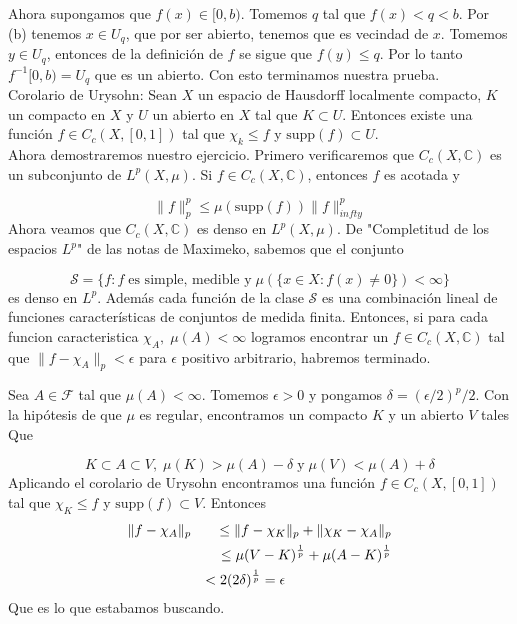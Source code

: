 \documentclass[12pt]{article}
\begin{document}
    Ahora supongamos que $f(x)\in [0,b)$. Tomemos $q$ tal que $f(x) < q < b$. Por (b)
    tenemos $x\in U_q$, que por ser abierto, tenemos que es vecindad de $x$. Tomemos 
    $y\in U_q$, entonces de la definici\'on de $f$ se sigue que $f(y) \leq q$. Por lo 
    tanto $f^{-1}[0,b) = U_q$ que es un abierto. Con esto terminamos nuestra prueba.
    \\

    Corolario de Urysohn: Sean $X$ un espacio de Hausdorff localmente compacto, $K$ un 
    compacto en $X$ y $U$ un abierto en $X$ tal que $K\subset U$. Entonces existe una 
    funci\'on $f\in C_c(X,[0,1])$ tal que $\chi_k \leq f$ y $\mathrm{supp} (f)\subset U$.
    \\

    Ahora demostraremos nuestro ejercicio. Primero verificaremos que $C_c(X,\mathbb{C})$ 
    es un subconjunto de $L^p(X,\mu)$. Si $f\in C_c(X,\mathbb{C})$, entonces $f$ es acotada
    y 

    \[\|f\|_p^p \leq \mu(\mathrm{supp}(f))\|f\|_{infty}^p\]
    Ahora veamos que $C_c(X,\mathbb{C})$ es denso en $L^p(X,\mu)$. De "Completitud de los espacios $L^p$"
    de las notas de Maximeko, sabemos que el conjunto 

    \[\mathcal{S} = \{f : f\;\text{es simple, medible y}\; \mu(\{x\in X : f(x)\neq 0\}) < \infty\}\]
    es denso en $L^p$. Adem\'as cada funci\'on de la clase $\mathcal{S}$ es una combinaci\'on
    lineal de funciones caracter\'isticas de conjuntos de medida finita. Entonces, si 
    para cada funcion caracteristica $\chi_A,\; \mu(A) < \infty$ logramos encontrar un $f\in C_c(X,\mathbb{C})$
    tal que $\|f-\chi_A\|_p < \epsilon$ para $\epsilon$ positivo arbitrario, habremos 
    terminado.

    Sea $A\in \mathcal{F}$ tal que $\mu(A) < \infty$. Tomemos $\epsilon > 0$ y pongamos 
    $\delta = (\epsilon/2)^p/2$. Con la hip\'otesis de que $\mu$ es regular, encontramos 
    un compacto $K$ y un abierto $V$ tales Que

    \[K\subset A \subset V,\; \mu(K) > \mu(A)-\delta\; \text{y}\; \mu(V) < \mu(A)+\delta\]
    Aplicando el corolario de Urysohn encontramos una funci\'on $f\in C_c(X,[0,1])$ tal que 
    $\chi_K \leq f$ y $\mathrm{supp}(f) \subset V$. Entonces
    \begin{equation*}
        \begin{aligned}
            &\|f-\chi_A\|_p & \leq \|f-\chi_K\|_p+\|\chi_K-\chi_A\|_p \\
            & &\leq \mu(V-K)^{\frac{1}{p}}+\mu(A-K)^{\frac{1}{p}} \\ 
            & &< 2(2\delta)^{\frac{1}{p}} = \epsilon \hspace*{76pt}
        \end{aligned}
    \end{equation*}
    Que es lo que estabamos buscando.

    
\end{document}
